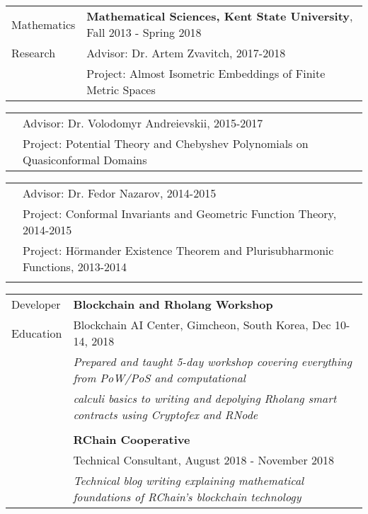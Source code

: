 \documentclass[letterpaper,10pt,oneside]{article}
\begin{document}
\vfill

\noindent \begin{tabular}{@{} l l}
 \Large{Mathematics} & \textbf{Mathematical Sciences, Kent State University}, Fall 2013 - Spring 2018 \\
 \Large{Research} & Advisor: Dr. Artem Zvavitch, 2017-2018 \\
 \hspace{1.1in} & Project: Almost Isometric Embeddings of Finite Metric Spaces \\
\end{tabular}

\vfill

\noindent \begin{tabular}{@{} l l}
 \hspace{1.1in} & Advisor: Dr. Volodomyr Andreievskii, 2015-2017 \\
 & Project: Potential Theory and Chebyshev Polynomials on Quasiconformal Domains \\
\end{tabular}

\vfill

\noindent \begin{tabular}{@{} l l}
 \hspace{1.1in} %
 & Advisor: Dr. Fedor Nazarov, 2014-2015 \\
 & Project: Conformal Invariants and Geometric Function Theory, 2014-2015 \\
 & Project: H\"{o}rmander Existence Theorem and Plurisubharmonic Functions, 2013-2014 \\
 & \\
\end{tabular}

\vfill

\noindent \begin{tabular}{@{} l l}
 \Large{Developer}  & \textbf{Blockchain and Rholang Workshop} \\
 \Large{Education} & Blockchain AI Center, Gimcheon, South Korea, Dec 10-14, 2018 \\
 \hspace{1.1in} & \emph{Prepared and taught 5-day workshop covering everything from PoW/PoS and computational} \\
 & \emph{calculi basics to writing and depolying Rholang smart contracts using Cryptofex and RNode} \\
 & \\
 &  \textbf{RChain Cooperative} \\
 & Technical Consultant, August 2018 - November 2018 \\
 & \emph{Technical blog writing explaining mathematical foundations of RChain's blockchain technology} \\
\end{tabular}
\end{document}
